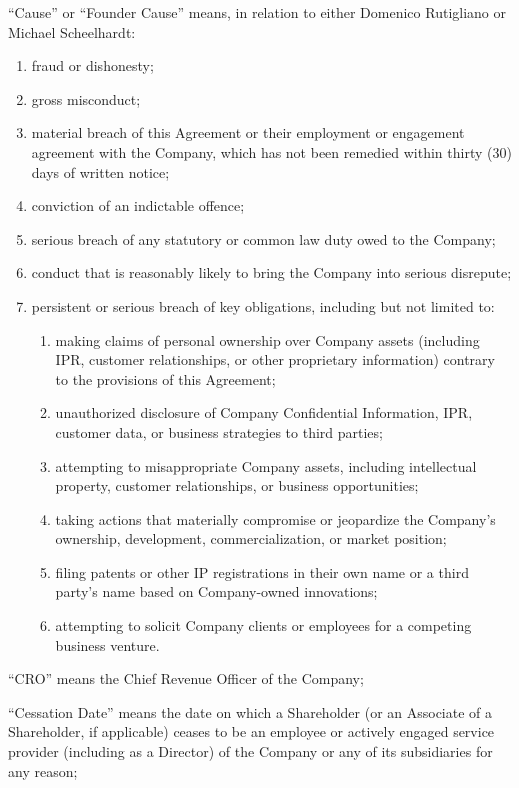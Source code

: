 ``Cause'' or ``Founder Cause'' means, in relation to either Domenico Rutigliano or Michael Scheelhardt:
\begin{enumerate}[label=(\alph*)]
\item fraud or dishonesty;
\item gross misconduct;
\item material breach of this Agreement or their employment or engagement agreement with the Company, which has not been remedied within thirty (30) days of written notice;
\item conviction of an indictable offence;
\item serious breach of any statutory or common law duty owed to the Company;
\item conduct that is reasonably likely to bring the Company into serious disrepute;
\item persistent or serious breach of key obligations, including but not limited to:
    \begin{enumerate}[label=(\roman*)]
    \item making claims of personal ownership over Company assets (including IPR, customer relationships, or other proprietary information) contrary to the provisions of this Agreement;
    \item unauthorized disclosure of Company Confidential Information, IPR, customer data, or business strategies to third parties;
    \item attempting to misappropriate Company assets, including intellectual property, customer relationships, or business opportunities;
    \item taking actions that materially compromise or jeopardize the Company's ownership, development, commercialization, or market position;
    \item filing patents or other IP registrations in their own name or a third party's name based on Company-owned innovations;
    \item attempting to solicit Company clients or employees for a competing business venture.
    \end{enumerate}
\end{enumerate}

``CRO'' means the Chief Revenue Officer of the Company;

``Cessation Date'' means the date on which a Shareholder (or an Associate of a Shareholder, if applicable) ceases to be an employee or actively engaged service provider (including as a Director) of the Company or any of its subsidiaries for any reason;


